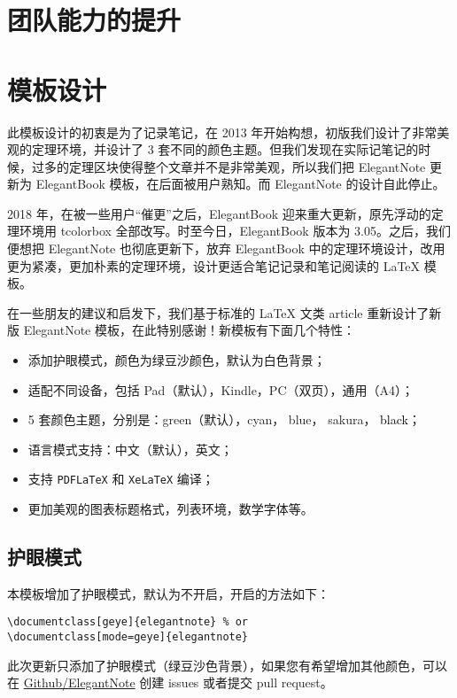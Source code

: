 \documentclass[cn,normal,11pt]{../elegantnote}
\begin{document}
\section{团队能力的提升}


\section{模板设计}
此模板设计的初衷是为了记录笔记，在 2013 年开始构想，初版我们设计了非常美观的定理环境，并设计了 3 套不同的颜色主题。但我们发现在实际记笔记的时候，过多的定理区块使得整个文章并不是非常美观，所以我们把 ElegantNote 更新为 ElegantBook 模板，在后面被用户熟知。而 ElegantNote 的设计自此停止。

2018 年，在被一些用户“催更”之后，ElegantBook 迎来重大更新，原先浮动的定理环境用 tcolorbox 全部改写。时至今日，ElegantBook 版本为 3.05。之后，我们便想把 ElegantNote 也彻底更新下，放弃 ElegantBook 中的定理环境设计，改用更为紧凑，更加朴素的定理环境，设计更适合笔记记录和笔记阅读的 \LaTeX{} 模板。

在一些朋友的建议和启发下，我们基于标准的 \LaTeX{} 文类 article 重新设计了新版 ElegantNote 模板，在此特别感谢！新模板有下面几个特性：
\begin{itemize}
\item 添加护眼模式，颜色为绿豆沙颜色，默认为白色背景；
\item 适配不同设备，包括 Pad（默认），Kindle，PC（双页），通用（A4）；
\item 5 套颜色主题，分别是：\textcolor{egreen}{green}（默认），\textcolor{ecyan}{cyan}， \textcolor{eblue}{blue}， \textcolor{sakura}{sakura}， \textcolor{black}{black}；
\item 语言模式支持：中文（默认），英文；
\item 支持 \lstinline{PDFLaTeX} 和 \lstinline{XeLaTeX} 编译；
\item 更加美观的图表标题格式，列表环境，数学字体等。
\end{itemize}

\subsection{护眼模式}
本模板增加了护眼模式，默认为不开启，开启的方法如下：
\begin{lstlisting}[frame=none]  
\documentclass[geye]{elegantnote} % or
\documentclass[mode=geye]{elegantnote}
\end{lstlisting}

\begin{remark}
此次更新只添加了护眼模式（绿豆沙色背景），如果您有希望增加其他颜色，可以在 \href{https://github.com/ElegantLaTeX/ElegantNote}{Github/ElegantNote} 创建 issues 或者提交 pull request。
\end{remark}
\end{document}
